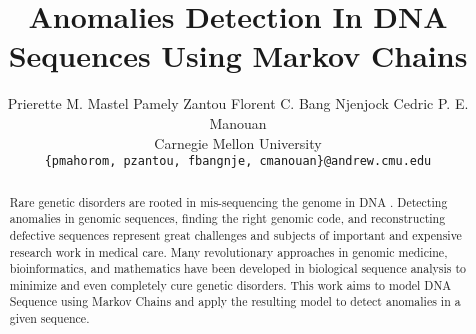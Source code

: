 \documentclass[10pt,twocolumn,letterpaper]{article}
\begin{document}
\title{Anomalies Detection In DNA Sequences Using Markov Chains}

\author{Prierette M. Mastel \quad Pamely Zantou \quad Florent C. Bang Njenjock \quad Cedric P. E. Manouan \\
Carnegie Mellon University\\
{\tt\small \{pmahorom, pzantou, fbangnje, cmanouan\}@andrew.cmu.edu}
}


\maketitle

\begin{abstract}
    Rare genetic disorders are rooted in mis-sequencing the
    genome in DNA \cite{posey}. Detecting anomalies in genomic sequences, finding the right genomic code, and reconstructing
    defective sequences represent great challenges and subjects
    of important and expensive research work in medical care.
    Many revolutionary approaches in genomic medicine, bioinformatics, and mathematics have been developed in biological
    sequence analysis to minimize and even completely cure
    genetic disorders. This work aims to model DNA Sequence
    using Markov Chains and apply the resulting model to detect anomalies in a given sequence.
\end{abstract}


\end{document}
